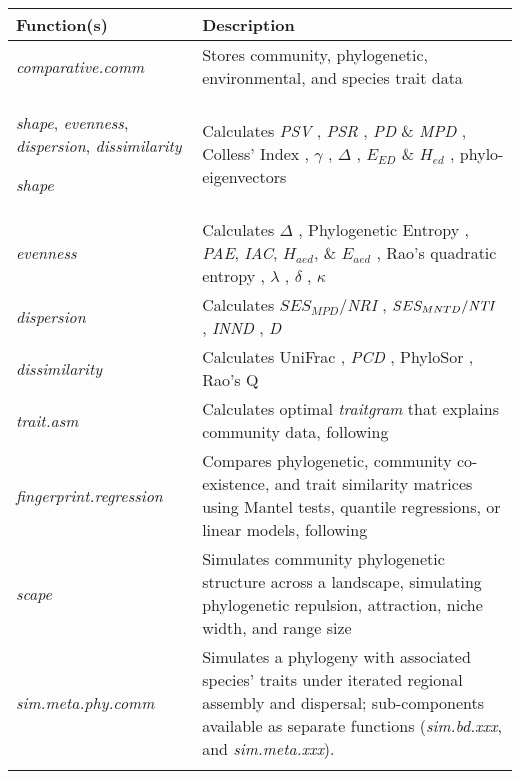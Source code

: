 \documentclass{bioinfo}
\begin{document}
\begin{table*}
  {\begin{tabular}{p{2.5cm} p{15cm}}\toprule
      Function(s) & Description\\\midrule
      \emph{comparative.comm} & Stores community, phylogenetic, environmental, and species trait data\\
      \emph{shape}, \emph{evenness}, \emph{dispersion}, \emph{dissimilarity}


      \emph{shape} & Calculates \emph{PSV} \citep{Helmus2007}, \emph{PSR} \citep{Helmus2007}, \emph{PD} \& \emph{MPD} \citep{Faith1992}, Colless' Index \citep{Colless1982}, $\gamma$ \citep{Pybus2000}, $\Delta$ \citep{Warwick1995}, $E_{ED}$ \& $H_{ed}$ \citep{Cadotte2010}, phylo-eigenvectors \citep{Diniz-Filho2011}\\
      \emph{evenness} & Calculates $\Delta$ \citep{Warwick1995}, Phylogenetic Entropy \citep{Allen2009}, \emph{PAE}, \emph{IAC}, $H_{aed}$, \& $E_{aed}$ \citep{Cadotte2010}, Rao's quadratic entropy \citep{Rao1982a}, $\lambda$ \citep{Pagel1999}, $\delta$ \citep{Pagel1999}, $\kappa$ \citep{Pagel1999}\\
      \emph{dispersion} & Calculates $SES_{MPD}$/\emph{NRI} \citep{Webb2002,Kembel2009}, $SES_{MNTD}/\emph{NTI}$ \citep{Webb2002,Kembel2009}, \emph{INND} \citep{Ness2011}, \emph{D} \citep{Fritz2010}\\
      \emph{dissimilarity} &  Calculates UniFrac \citep{Lozupone2005}, \emph{PCD} \citep{Ives2010}, PhyloSor \citep{Bryant2008}, Rao's Q \citep{Rao1982a}\\
      \emph{trait.asm} & Calculates optimal \emph{traitgram} that explains community data, following \citep{Ackerly2009,Cadotte2013}\\
      \emph{fingerprint.regression} & Compares phylogenetic, community co-existence, and trait similarity matrices using Mantel tests, quantile regressions, or linear models, following \citep{Cavender-Bares2004} \\
      \emph{scape} & Simulates community phylogenetic structure across a landscape, simulating phylogenetic repulsion, attraction, niche width, and range size \citep{Helmus2012}\\
      \emph{sim.meta.phy.comm} & Simulates a phylogeny with associated species' traits under iterated regional assembly and dispersal; sub-components available as separate functions  (\emph{sim.bd.xxx}, and \emph{sim.meta.xxx}).\\
      \botrule
\end{tabular}}{}
\end{table*}
\end{document}

